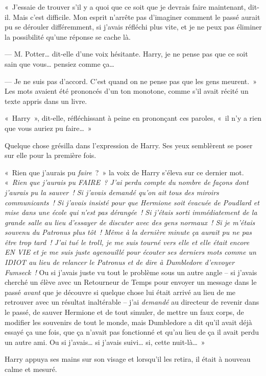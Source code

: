 «~J'essaie de trouver s'il y a quoi que ce soit que je devrais faire maintenant, dit-il. Mais c'est difficile. Mon esprit n'arrête pas d'imaginer comment le passé aurait pu se dérouler différemment, si j'avais réfléchi plus vite, et je ne peux pas éliminer la possibilité qu'une réponse se cache là.

--- M. Potter… dit-elle d'une voix hésitante. Harry, je ne pense pas que ce soit sain que vous… pensiez comme ça…

--- Je ne suis pas d'accord. C'est quand on ne pense pas que les gens meurent.~» Les mots avaient été prononcés d'un ton monotone, comme s'il avait récité un texte appris dans un livre.

«~Harry~», dit-elle, réfléchissant à peine en prononçant ces paroles, «~il n'y a rien que vous auriez pu faire…~»

Quelque chose grésilla dans l'expression de Harry. Ses yeux semblèrent se poser sur elle pour la première fois.

«~Rien que j'aurais pu \emph{faire}~?~» la voix de Harry s'éleva sur ce dernier mot. «~\emph{Rien que j'aurais pu FAIRE~? J'ai perdu compte du nombre de façons dont j'aurais pu la sauver~! Si j'avais demandé qu'on ait tous des miroirs communicants~! Si j'avais insisté pour que Hermione soit évacuée de Poudlard et mise dans une école qui n'est pas dérangée~! Si j'étais sorti immédiatement de la grande salle au lieu d'essayer de discuter avec des gens normaux~! Si je m'étais souvenu du Patronus plus tôt~! Même à la dernière minute ça aurait pu ne pas être trop tard~! J'ai tué le troll, je me suis tourné vers elle et elle était encore EN VIE et je me suis juste agenouillé pour écouter ses derniers mots comme un IDIOT au lieu de relancer le Patronus et de dire à Dumbledore d'envoyer Fumseck~!} Ou si j'avais juste vu tout le problème sous un autre angle -- si j'avais cherché un élève avec un Retourneur de Temps pour envoyer un message dans le passé \emph{avant} que je découvre si quelque chose lui était arrivé au lieu de me retrouver avec un résultat inaltérable -- j'ai \emph{demandé} au directeur de revenir dans le passé, de sauver Hermione et de tout simuler, de mettre un faux corps, de modifier les souvenirs de tout le monde, mais Dumbledore a dit qu'il avait déjà essayé ça une fois, que ça n'avait pas fonctionné et qu'au lieu de ça il avait perdu un autre ami. Ou si j'avais… si j'avais suivi… si, cette nuit-là…~»

Harry appuya ses mains sur son visage et lorsqu'il les retira, il était à nouveau calme et mesuré.

